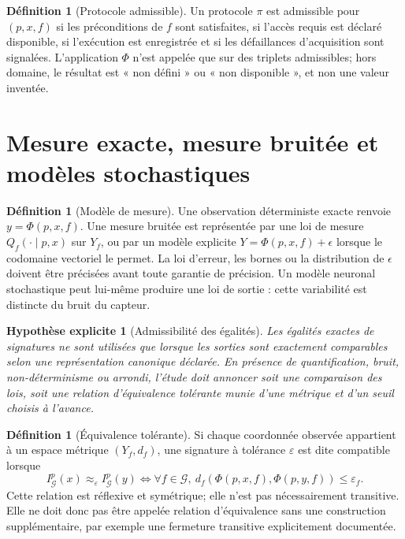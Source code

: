 \documentclass[11pt,oneside]{book}
\newtheorem{hypothese}[theoreme]{Hypothèse explicite}
\theoremstyle{definition}
\newtheorem{definition}[theoreme]{Définition}
\theoremstyle{remark}
\newcommand{\Gcal}{\mathcal G}
\newcommand{\1}{\mathbf 1}
\newcommand{\eps}{\varepsilon}
\begin{document}
\begin{definition}[Protocole admissible]
Un protocole $\pi$ est admissible pour $(p,x,f)$ si les préconditions de $f$ sont satisfaites, si l'accès requis est déclaré disponible, si l'exécution est enregistrée et si les défaillances d'acquisition sont signalées. L'application $\Phi$ n'est appelée que sur des triplets admissibles; hors domaine, le résultat est « non défini » ou « non disponible », et non une valeur inventée.
\end{definition}

\section{Mesure exacte, mesure bruitée et modèles stochastiques}
\begin{definition}[Modèle de mesure]
Une observation déterministe exacte renvoie $y=\Phi(p,x,f)$. Une mesure bruitée est représentée par une loi de mesure $Q_f(\cdot\mid p,x)$ sur $Y_f$, ou par un modèle explicite $Y=\Phi(p,x,f)+\epsilon$ lorsque le codomaine vectoriel le permet. La loi d'erreur, les bornes ou la distribution de $\epsilon$ doivent être précisées avant toute garantie de précision. Un modèle neuronal stochastique peut lui-même produire une loi de sortie : cette variabilité est distincte du bruit du capteur.
\end{definition}

\begin{hypothese}[Admissibilité des égalités]
Les égalités exactes de signatures ne sont utilisées que lorsque les sorties sont exactement comparables selon une représentation canonique déclarée. En présence de quantification, bruit, non-déterminisme ou arrondi, l'étude doit annoncer soit une comparaison des lois, soit une relation d'équivalence tolérante munie d'une métrique et d'un seuil choisis à l'avance.
\end{hypothese}

\begin{definition}[Équivalence tolérante]
Si chaque coordonnée observée appartient à un espace métrique $(Y_f,d_f)$, une signature à tolérance $\eps$ est dite compatible lorsque
\[
I_{\Gcal}^{p}(x)\approx_{\eps} I_{\Gcal}^{p}(y)
\iff \forall f\in\Gcal,\ d_f(\Phi(p,x,f),\Phi(p,y,f))\leq\eps_f.
\]
Cette relation est réflexive et symétrique; elle n'est pas nécessairement transitive. Elle ne doit donc pas être appelée relation d'équivalence sans une construction supplémentaire, par exemple une fermeture transitive explicitement documentée.
\end{definition}
\end{document}
